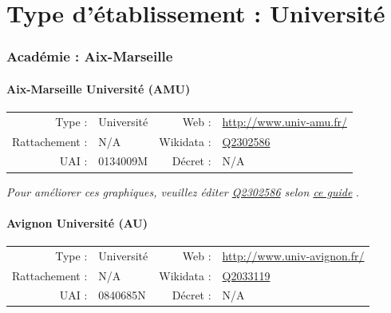 \documentclass[12pt,french,landscape]{article}
\begin{document}
\newpage
\scriptsize

\newpage   
\vspace*{5cm}   
\part{Type d'établissement :  Université }   
\newpage

\hypertarget{acaduxe9mie-aix-marseille}{%
\section{Académie : Aix-Marseille}\label{acaduxe9mie-aix-marseille}}

\hypertarget{aix-marseille-universituxe9-amu}{%
\subsection{Aix-Marseille Université
(AMU)}\label{aix-marseille-universituxe9-amu}}

\begin{tabular*}{0.45\textwidth}{rp{2cm}rl}  
\hline  
Type : & Université & Web : &\href{http://www.univ-amu.fr/}{http://www.univ-amu.fr/} \\  
Rattachement : & N/A & Wikidata : & \href{https://www.wikidata.org/entity/Q2302586}{Q2302586} \\  
UAI : & 0134009M & Décret : & N/A \\  
\hline  
\end{tabular*}

\textit{\scriptsize Pour améliorer ces graphiques, veuillez éditer \href{https://www.wikidata.org/entity/Q2302586}{Q2302586}  selon \href{https://github.com/cpesr/wikidataESR/blob/master/Rmd/wikidataESR.md}{ce guide}}
.


\newpage

\hypertarget{avignon-universituxe9-au}{%
\subsection{Avignon Université (AU)}\label{avignon-universituxe9-au}}

\begin{tabular*}{0.45\textwidth}{rp{2cm}rl}  
\hline  
Type : & Université & Web : &\href{http://www.univ-avignon.fr/}{http://www.univ-avignon.fr/} \\  
Rattachement : & N/A & Wikidata : & \href{https://www.wikidata.org/entity/Q2033119}{Q2033119} \\  
UAI : & 0840685N & Décret : & N/A \\  
\hline  
\end{tabular*}
\end{document}
